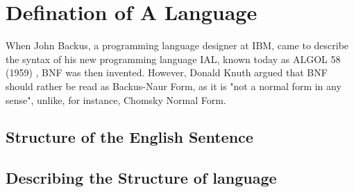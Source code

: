 \section{Defination of A Language}
When John Backus, a programming language designer at IBM, came to describe the syntax of his new programming language IAL, known today as ALGOL 58 (1959)\cite{BNF_ALGOL} , BNF was then invented.
However, Donald Knuth argued that BNF should rather be read as Backus-Naur Form, as it is "not a normal form in any sense",\cite{BNFvsBNF} unlike, for instance, Chomsky Normal Form.

\subsection{Structure of the English Sentence}


\subsection{Describing the Structure of language}


